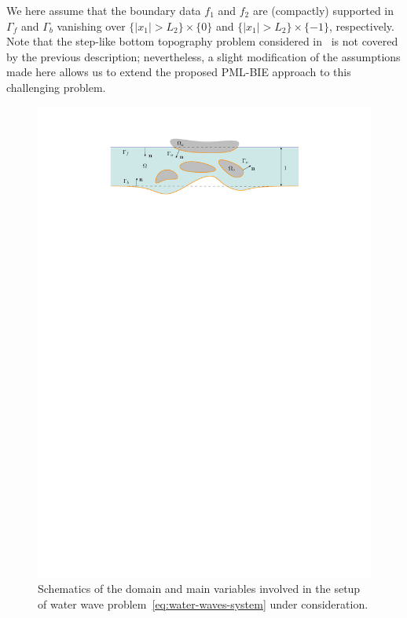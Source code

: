 \documentclass[review,hidelinks,onefignum,onetabnum]{siamart220329}
\begin{document}
We here assume that the boundary data $f_1$ and $f_2$ are (compactly) supported in $\Gamma_f$ and $\Gamma_b$ vanishing over $\{|x_1|>L_2\}\times\{0\}$ and $\{|x_1|>L_2\}\times\{-1\}$, respectively. Note that the step-like bottom topography problem considered in~ is not covered by the previous description; nevertheless, a slight modification of the assumptions made here allows us to extend the proposed PML-BIE approach to this challenging problem.

\begin{figure}
\includegraphics[scale=1]{WW_problem.pdf}
  \centering	  
  \caption{Schematics of the domain and main variables involved in the setup of water wave problem~\eqref{eq:water-waves-system} under consideration. \label{fig:schematic-geometry}}
\end{figure}
\end{document}
